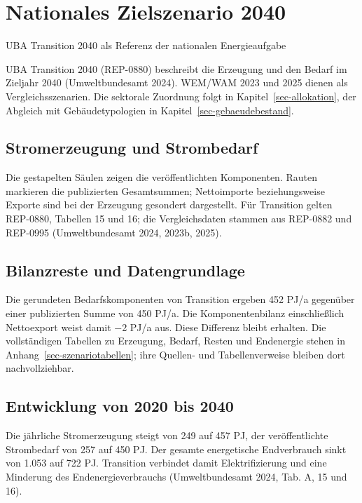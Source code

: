 \documentclass[
  ngerman,
  a4paper,
  DIV=11]{scrreprt}
\begin{document}
\chapter{Nationales Zielszenario 2040}\label{sec-zielszenario}

UBA Transition 2040 als Referenz der nationalen Energieaufgabe

UBA Transition 2040 (REP-0880) beschreibt die Erzeugung und den Bedarf
im Zieljahr 2040 (Umweltbundesamt 2024). WEM/WAM 2023 und 2025 dienen
als Vergleichsszenarien. Die sektorale Zuordnung folgt in
Kapitel~\ref{sec-allokation}, der Abgleich mit Gebäudetypologien in
Kapitel~\ref{sec-gebaeudebestand}.

\section{Stromerzeugung und
Strombedarf}\label{stromerzeugung-und-strombedarf}

Die gestapelten Säulen zeigen die veröffentlichten Komponenten. Rauten
markieren die publizierten Gesamtsummen; Nettoimporte beziehungsweise
Exporte sind bei der Erzeugung gesondert dargestellt. Für Transition
gelten REP-0880, Tabellen 15 und 16; die Vergleichsdaten stammen aus
REP-0882 und REP-0995 (Umweltbundesamt 2024, 2023b, 2025).

\section{Bilanzreste und
Datengrundlage}\label{bilanzreste-und-datengrundlage}

Die gerundeten Bedarfskomponenten von Transition ergeben 452 PJ/a
gegenüber einer publizierten Summe von 450 PJ/a. Die Komponentenbilanz
einschließlich Nettoexport weist damit −2 PJ/a aus. Diese Differenz
bleibt erhalten. Die vollständigen Tabellen zu Erzeugung, Bedarf, Resten
und Endenergie stehen in Anhang~\ref{sec-szenariotabellen}; ihre
Quellen- und Tabellenverweise bleiben dort nachvollziehbar.

\section{Entwicklung von 2020 bis
2040}\label{entwicklung-von-2020-bis-2040}

Die jährliche Stromerzeugung steigt von 249 auf 457 PJ, der
veröffentlichte Strombedarf von 257 auf 450 PJ. Der gesamte energetische
Endverbrauch sinkt von 1.053 auf 722 PJ. Transition verbindet damit
Elektrifizierung und eine Minderung des Endenergieverbrauchs
(Umweltbundesamt 2024, Tab. A, 15 und 16).
\end{document}
